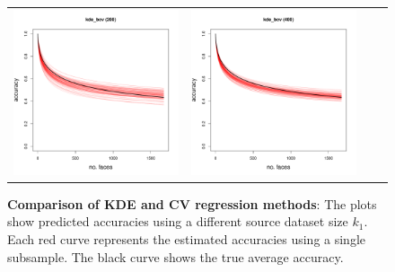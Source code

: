 \documentclass[twoside,11pt]{article}
\begin{document}
\begin{figure}
\begin{tabular}{cccc}
\includegraphics[scale = 0.2, clip = true, trim = 0 0 0 0.6in]{repeat_200_kde_bcv.pdf} &
\includegraphics[scale = 0.2, clip = true, trim = 0 0 0 0.6in]{repeat_400_kde_bcv.pdf} \\
\end{tabular}
\caption{\textbf{Comparison of KDE and CV regression methods}: The
  plots show predicted accuracies using a different source dataset
  size $k_1$. Each red curve represents the estimated accuracies using
  a single subsample. The black curve shows the true average
  accuracy. }
\label{fig:lfw_extrapolation2}
\end{figure}
\end{document}
